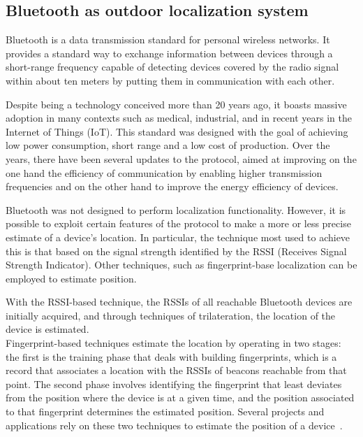 


\subsection{Bluetooth as outdoor localization system}
Bluetooth is a data transmission standard for personal wireless networks. It provides a standard way to exchange information between
devices through a short-range frequency capable of detecting devices covered by the radio signal within about ten meters by putting them
in communication with each other.

Despite being a technology conceived more than 20 years ago, it boasts massive adoption in many contexts such as medical, industrial, and in
recent years in the Internet of Things (IoT). This standard was designed with the goal of achieving low power consumption, short range
and a low cost of production. Over the years, there have been several updates to the protocol, aimed at improving on the one hand the efficiency of
communication by enabling higher transmission frequencies and on the other hand to improve the energy efficiency of devices.

Bluetooth was not designed to perform localization functionality. However, it is possible to exploit certain
features of the protocol to make a more or less precise estimate of a device's location. In particular, the technique most
used to achieve this is that based on the signal strength identified by the RSSI (Receives Signal Strength Indicator).
Other techniques, such as fingerprint-base localization can be employed to estimate position.

With the RSSI-based technique, the RSSIs of all reachable Bluetooth devices are initially acquired, and through techniques of trilateration, the
location of the device is estimated.\\
Fingerprint-based techniques estimate the location by operating in two stages: the first is the training phase that deals with building fingerprints,
which is a record that associates a location with the RSSIs of beacons reachable from that
point. The second phase involves identifying the fingerprint that least deviates from the position where the device is at a given time, and the
position associated to that fingerprint determines the estimated position. Several projects and applications rely on these two techniques to estimate
the position of a device~\cite{mcconville2021vesta, samuel2021smart}.

